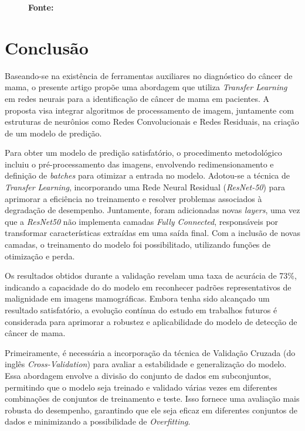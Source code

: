 \begin{figure}[ht]
\begin{minipage}[b]{0.45\textwidth}
        \label{fig:predicao_com}
        \textbf{\footnotesize Fonte: \href{https://www.kaggle.com/datasets/awsaf49/cbis-ddsm-breast-cancer-image-dataset}{\cite{newdatabase}}}
    \end{minipage}
\end{figure}




\section{\esp Conclusão} \label{conclusion}
Baseando-se na existência de ferramentas auxiliares no diagnóstico do câncer de mama, o presente artigo propõe uma abordagem que utiliza \textit{Transfer Learning} em redes neurais para a identificação de câncer de mama em pacientes. A proposta visa integrar algoritmos de processamento de imagem, juntamente com estruturas de neurônios como Redes Convolucionais e Redes Residuais, na criação de um modelo de predição. 

Para obter um modelo de predição satisfatório, o procedimento metodológico incluiu o pré-processamento das imagens, envolvendo redimensionamento e definição de \textit{batches} para otimizar a entrada no modelo. Adotou-se a técnica de \textit{Transfer Learning}, incorporando uma Rede Neural Residual (\textit{ResNet-50}) para aprimorar a eficiência no treinamento e resolver problemas associados à degradação de desempenho. Juntamente, foram adicionadas novas \textit{layers}, uma vez que a \textit{ResNet50} não implementa camadas \textit{Fully Connected}, responsáveis por transformar características extraídas em uma saída final. Com a inclusão de novas camadas, o treinamento do modelo foi possibilitado, utilizando funções de otimização e perda.

Os resultados obtidos durante a validação revelam uma taxa de acurácia de 73\%, indicando a capacidade do do modelo em reconhecer padrões representativos de malignidade em imagens mamográficas. Embora tenha sido alcançado um resultado satisfatório, a evolução contínua do estudo em trabalhos futuros é considerada para aprimorar a robustez e aplicabilidade do modelo de detecção de câncer de mama. 



Primeiramente, é necessária a incorporação da técnica de Validação Cruzada (do inglês \textit{Cross-Validation}) para avaliar a estabilidade e generalização do modelo. Essa abordagem envolve a divisão do conjunto de dados em subconjuntos, permitindo que o modelo seja treinado e validado várias vezes em diferentes combinações de conjuntos de treinamento e teste. Isso fornece uma avaliação mais robusta do desempenho, garantindo que ele seja eficaz em diferentes conjuntos de dados e minimizando a possibilidade de \textit{Overfitting}.

